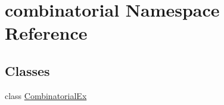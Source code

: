 \hypertarget{namespacecombinatorial}{\section{combinatorial Namespace Reference}
\label{namespacecombinatorial}
}
\subsection*{Classes}
\begin{DoxyCompactItemize}
\item 
class \hyperlink{classcombinatorial_1_1_combinatorial_ex}{Combinatorial\-Ex}
\end{DoxyCompactItemize}
